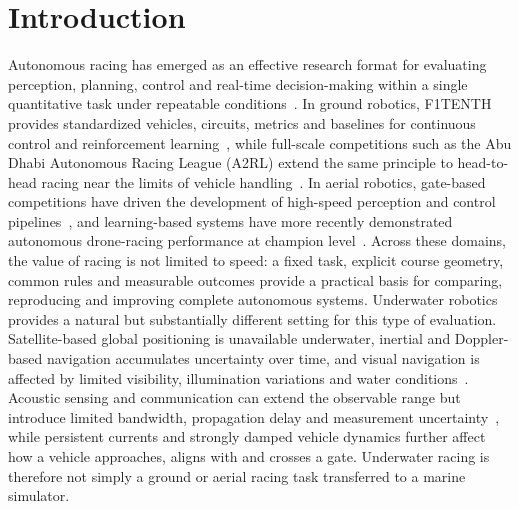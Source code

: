 \section{Introduction}
\label{sec:introduction}

Autonomous racing has emerged as an effective research format for evaluating
perception, planning, control and real-time decision-making within a single
quantitative task under repeatable conditions~\cite{betz2022autonomous}. In
ground robotics, F1TENTH provides standardized vehicles, circuits, metrics and
baselines for continuous control and reinforcement learning~\cite{okelly2020f1tenth},
while full-scale competitions such as the Abu Dhabi Autonomous Racing League
(A2RL) extend the same principle to head-to-head racing near the limits of
vehicle handling~\cite{hoffmann2026a2rl}. In aerial robotics, gate-based
competitions have driven the development of high-speed perception and control
pipelines~\cite{foehn2020alphapilot}, and learning-based systems have more
recently demonstrated autonomous drone-racing performance at champion
level~\cite{kaufmann2023swift}. Across these domains, the value of racing is not
limited to speed: a fixed task, explicit course geometry, common rules and
measurable outcomes provide a practical basis for comparing, reproducing and
improving complete autonomous systems. Underwater robotics provides a natural
but substantially different setting for this type of evaluation. Satellite-based
global positioning is unavailable underwater, inertial and Doppler-based
navigation accumulates uncertainty over time, and visual navigation is affected
by limited visibility, illumination variations and water
conditions~\cite{manzanilla2019uuvnavigation}. Acoustic sensing and
communication can extend the observable range but introduce limited bandwidth,
propagation delay and measurement uncertainty~\cite{stojanovic2009underwater},
while persistent currents and strongly damped vehicle dynamics further affect
how a vehicle approaches, aligns with and crosses a gate. Underwater racing is
therefore not simply a ground or aerial racing task transferred to a marine
simulator.



